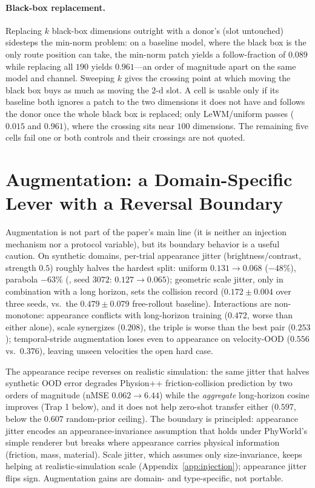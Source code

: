\paragraph{Black-box replacement.}
Replacing $k$ black-box dimensions outright with a donor's (slot untouched) sidesteps the min-norm problem: on a baseline model, where the black box is the only route position can take, the min-norm patch yields a follow-fraction of $0.089$ while replacing all $190$ yields $0.961$---an order of magnitude apart on the same model and channel. Sweeping $k$ gives the crossing point at which moving the black box buys as much as moving the $2$-d slot. A cell is usable only if its baseline both ignores a patch to the two dimensions it does not have and follows the donor once the whole black box is replaced; only LeWM/uniform passes ($0.015$ and $0.961$), where the crossing sits near $100$ dimensions. The remaining five cells fail one or both controls and their crossings are not quoted.

\section{Augmentation: a Domain-Specific Lever with a Reversal Boundary}
\label{app:aug}

Augmentation is not part of the paper's main line (it is neither an injection mechanism nor a protocol variable), but its boundary behavior is a useful caution. On synthetic domains, per-trial appearance jitter (brightness/contrast, strength $0.5$) roughly halves the hardest split: uniform $0.131\!\to\!0.068$ ($-48\%$), parabola $-63\%$ (\rmood{}, seed $3072$: $0.127\!\to\!0.065$); geometric scale jitter, only in combination with a long horizon, sets the collision record ($0.172\pm0.004$ over three seeds, vs.\ the $0.479\pm0.079$ free-rollout baseline). Interactions are non-monotone: appearance conflicts with long-horizon training ($0.472$, worse than either alone), scale synergizes ($0.208$), the triple is worse than the best pair ($0.253$); temporal-stride augmentation loses even to appearance on velocity-OOD ($0.556$ vs.\ $0.376$), leaving unseen velocities the open hard case.

The appearance recipe reverses on realistic simulation: the same jitter that halves synthetic OOD error degrades Physion++ friction-collision prediction by two orders of magnitude (nMSE $0.062\!\to\!6.44$) while the \emph{aggregate} long-horizon cosine improves (Trap 1 below), and it does not help zero-shot transfer either ($0.597$, below the $0.607$ random-prior ceiling). The boundary is principled: appearance jitter encodes an appearance-invariance assumption that holds under PhyWorld's simple renderer but breaks where appearance carries physical information (friction, mass, material). Scale jitter, which assumes only size-invariance, keeps helping at realistic-simulation scale (Appendix~\ref{app:injection}); appearance jitter flips sign. Augmentation gains are domain- and type-specific, not portable.

